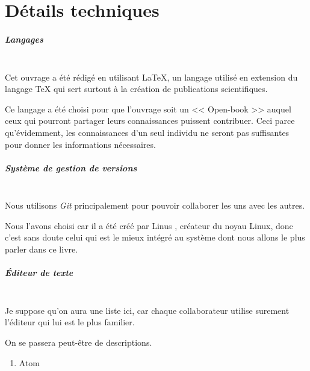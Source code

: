 \chapter{Détails techniques}

\paragraph{Langages} ~\\

Cet ouvrage a été rédigé en utilisant \LaTeX{}, un langage utilisé en extension
du langage \TeX{} qui sert surtout à la création de publications scientifiques.

Ce langage a été choisi pour que l'ouvrage soit un << Open-book >> auquel
ceux qui pourront partager leurs connaissances puissent contribuer. Ceci parce
qu'évidemment, les connaissances d'un seul individu ne seront pas suffisantes
pour donner les informations nécessaires.

\paragraph{Système de gestion de versions} ~\\

Nous utilisons \emph{Git} principalement pour pouvoir collaborer les uns avec
les autres.

Nous l'avons choisi car il a été créé par Linus , créateur du
noyau Linux, donc c'est sans doute celui qui est le mieux intégré au système
dont nous allons le plus parler dans ce livre.

\paragraph{Éditeur de texte} ~\\

Je suppose qu'on aura une liste ici, car chaque collaborateur utilise surement
l'éditeur qui lui est le plus familier.

On se passera peut-être de descriptions.

\begin{enumerate}
  \item Atom
\end{enumerate}
